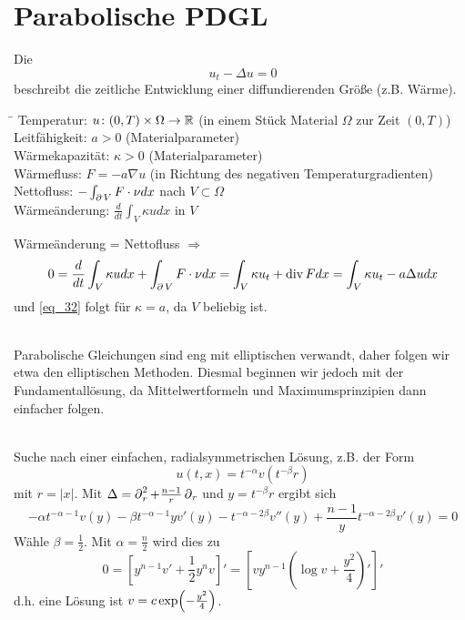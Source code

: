 \section{Parabolische PDGL}
\label{sec:para11}
	
\begin{defn}[Wärmeleitungsgleichung]
	Die  
	\begin{equation}
		u_t - \Delta u = 0 \label{eq_32}
	\end{equation}
	beschreibt die zeitliche Entwicklung einer diffundierenden Größe (z.B. Wärme).
	\begin{tabbing}
	\hspace{3cm}\=\kill
	Temperatur: \> $u \colon (0,T) \times \Omega \rightarrow \mathbb{R}$ (in einem Stück Material $\Omega$ zur Zeit $(0,T)$)\\ 
	Leitfähigkeit: \> $a > 0$ (Materialparameter)\\ 
	Wärmekapazität: \> $\kappa > 0$ (Materialparameter)\\ 
	Wärmefluss: \> $F = -a \nabla u$ (in Richtung des negativen Temperaturgradienten)\\ 
	Nettofluss: \> $- \int_{\operatorname{\partial} V} F \cdot \nu dx$ nach $V \subset \Omega$\\ 
	Wärmeänderung: \> $\frac{d}{dt} \int_V \kappa u dx$ in $V$ 
	\end{tabbing} 
	Wärmeänderung = Nettofluss $\Rightarrow$
	\[ 0 = \frac{d}{dt} \int_V \kappa u dx + \int_{\operatorname{\partial} V} F \cdot \nu dx = \int_V \kappa u_t + \operatorname{div} F dx = \int_V \kappa u_t - a \Delta u dx \]
	und \eqref{eq_32} folgt für $\kappa = a$, da $V$ beliebig ist.
\end{defn}
	
	\mbox{} \\
	Parabolische Gleichungen sind eng mit elliptischen verwandt, daher folgen wir etwa den elliptischen Methoden. Diesmal beginnen wir jedoch mit der Fundamentallösung, da Mittelwertformeln und Maximumsprinzipien dann einfacher folgen.
	
	\mbox{} \\
	Suche nach einer einfachen, radialsymmetrischen Lösung, z.B. der Form
	\[ u(t,x) = t^{-\alpha} v(t^{-\beta} r) \]
	mit $r = |x|$. Mit $\Delta = \operatorname{\partial}_r^2 + \frac{n-1}{r} \operatorname{\partial}_r$ und $y = t^{-\beta} r$ ergibt sich
	\[ -\alpha t^{-\alpha - 1} v(y) - \beta t^{-\alpha-1} y v'(y) - t^{-\alpha - 2\beta} v''(y) + \frac{n-1}{y} t^{-\alpha - 2\beta} v'(y) = 0\]
	Wähle $\beta = \frac{1}{2}$. Mit $\alpha = \frac{n}{2}$ wird dies zu
	\[ 0 = [y^{n-1} v' + \frac{1}{2} y^n v]' = [vy^{n-1} (\log v + \frac{y^2}{4})']' \]
	d.h. eine Lösung ist $v = c \exp \enbrace*{-\frac{y^2}{4}}$.
	
